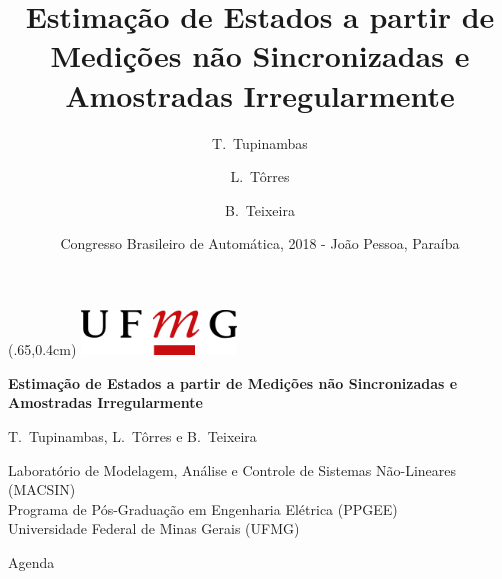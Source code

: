 \documentclass{beamer}
\title[Estimação com Amostragem Irregular]{Estimação de Estados a partir de Medições não Sincronizadas e Amostradas Irregularmente}
\author{T.~Tupinambas\inst{1} \and L.~Tôrres\inst{1} \and B.~Teixeira\inst{1}}
\institute[] %
{
  \inst{1}%
  Programa de Pós-Graduação em Engenharia Elétrica\\
  Universidade Federal de Minas Gerais}
\date[CBA, 2018 - João Pessoa/PB]{Congresso Brasileiro de Automática, 2018 - João Pessoa, Paraíba}
\renewcommand{\(}{\left(}
\renewcommand{\)}{\right)}
\renewcommand{\[}{\left[}
\renewcommand{\]}{\right]}
\begin{document}
{

%

	\begin{frame}[plain]
		\begin{textblock*}{100mm}(.65\textwidth,0.4cm)
			\includegraphics[height=1.2cm,width=4.14cm]{template/ufmg.png}
		\end{textblock*}
		\centering
		\vspace{3.5cm}
		\Large
		\textbf{Estimação de Estados a partir de Medições não Sincronizadas e Amostradas Irregularmente}
		
		
		\normalsize
		\vspace{0.5cm}
		T.~Tupinambas, L.~Tôrres e B.~Teixeira
			
		\vspace{0.5cm}
		Laboratório de Modelagem, Análise e Controle de Sistemas Não-Lineares
		(MACSIN)\\
		Programa de Pós-Graduação em Engenharia Elétrica (PPGEE)\\
		Universidade Federal de Minas Gerais (UFMG)
	\end{frame}
}
\addtocounter{framenumber}{-1}

{
	\begin{frame}{Agenda}
  		\tableofcontents
	\end{frame}
	\addtocounter{framenumber}{-1}
}
\end{document}
